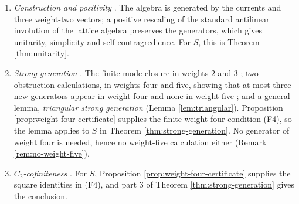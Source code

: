 \documentclass[leqno]{article}
\numberwithin{equation}{section}
\begin{document}
\begin{enumerate}
\item \emph{Construction and positivity} \cite[Sections 2--3, pp.~16--19]{Rie26b}. The algebra is generated by the currents and three weight-two vectors; a positive rescaling of the standard antilinear involution of the lattice algebra preserves the generators, which gives unitarity, simplicity and self-contragredience. For $S$, this is Theorem \ref{thm:unitarity}.

\item \emph{Strong generation} \cite[Section 4, pp.~20--24]{Rie26b}. The finite mode closure in weights $2$ and $3$ \cite[Proposition 4.1]{Rie26b}; two obstruction calculations, in weights four and five, showing that at most three new generators appear in weight four and none in weight five \cite[Proposition 4.2]{Rie26b}; and a general lemma, \emph{triangular strong generation} \cite[Lemma 4.3]{Rie26b} (Lemma \ref{lem:triangular}). Proposition \ref{prop:weight-four-certificate} supplies the finite weight-four condition \textup{(F4)}, so the lemma applies to $S$ in Theorem \ref{thm:strong-generation}. No generator of weight four is needed, hence no weight-five calculation either (Remark \ref{rem:no-weight-five}).

\item \emph{$C_2$-cofiniteness} \cite[Section 5, pp.~24--25]{Rie26b}. For $S$, Proposition \ref{prop:weight-four-certificate} supplies the square identities in \textup{(F4)}, and part 3 of Theorem \ref{thm:strong-generation} gives the conclusion.


\end{enumerate}
\end{document}
